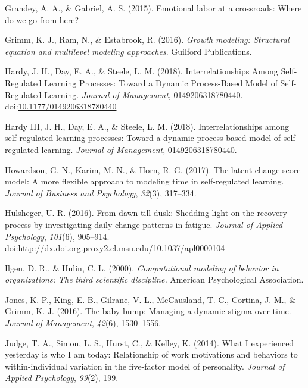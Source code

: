 \documentclass[english,,man]{apa6}
\theoremstyle{definition}
\theoremstyle{definition}
\theoremstyle{definition}
\theoremstyle{remark}
\begin{document}
\leavevmode\hypertarget{ref-grandey2015emotional}{}%
Grandey, A. A., \& Gabriel, A. S. (2015). Emotional labor at a
crossroads: Where do we go from here?

\leavevmode\hypertarget{ref-grimm_growth_2016}{}%
Grimm, K. J., Ram, N., \& Estabrook, R. (2016). \emph{Growth modeling:
Structural equation and multilevel modeling approaches}. Guilford
Publications.

\leavevmode\hypertarget{ref-hardy_interrelationships_2018}{}%
Hardy, J. H., Day, E. A., \& Steele, L. M. (2018). Interrelationships
Among Self-Regulated Learning Processes: Toward a Dynamic Process-Based
Model of Self-Regulated Learning. \emph{Journal of Management},
0149206318780440.
doi:\href{https://doi.org/10.1177/0149206318780440}{10.1177/0149206318780440}

\leavevmode\hypertarget{ref-hardy2018}{}%
Hardy III, J. H., Day, E. A., \& Steele, L. M. (2018).
Interrelationships among self-regulated learning processes: Toward a
dynamic process-based model of self-regulated learning. \emph{Journal of
Management}, 0149206318780440.

\leavevmode\hypertarget{ref-howardson2017latent}{}%
Howardson, G. N., Karim, M. N., \& Horn, R. G. (2017). The latent change
score model: A more flexible approach to modeling time in self-regulated
learning. \emph{Journal of Business and Psychology}, \emph{32}(3),
317--334.

\leavevmode\hypertarget{ref-hulsheger_dawn_2016}{}%
Hülsheger, U. R. (2016). From dawn till dusk: Shedding light on the
recovery process by investigating daily change patterns in fatigue.
\emph{Journal of Applied Psychology}, \emph{101}(6), 905--914.
doi:\href{https://doi.org/http://dx.doi.org.proxy2.cl.msu.edu/10.1037/apl0000104}{http://dx.doi.org.proxy2.cl.msu.edu/10.1037/apl0000104}

\leavevmode\hypertarget{ref-ilgen_computational_2000}{}%
Ilgen, D. R., \& Hulin, C. L. (2000). \emph{Computational modeling of
behavior in organizations: The third scientific discipline.} American
Psychological Association.

\leavevmode\hypertarget{ref-jones_baby_2016}{}%
Jones, K. P., King, E. B., Gilrane, V. L., McCausland, T. C., Cortina,
J. M., \& Grimm, K. J. (2016). The baby bump: Managing a dynamic stigma
over time. \emph{Journal of Management}, \emph{42}(6), 1530--1556.

\leavevmode\hypertarget{ref-judge_what_2014}{}%
Judge, T. A., Simon, L. S., Hurst, C., \& Kelley, K. (2014). What I
experienced yesterday is who I am today: Relationship of work
motivations and behaviors to within-individual variation in the
five-factor model of personality. \emph{Journal of Applied Psychology},
\emph{99}(2), 199.
\end{document}
